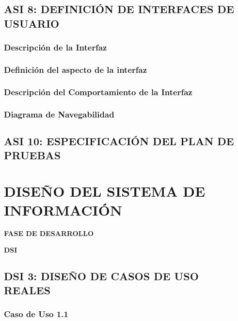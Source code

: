 \documentclass[11pt]{report}
\begin{document}
\newpage
\section{ASI 8: DEFINICIÓN DE INTERFACES DE USUARIO}

\subsection{Descripción de la Interfaz} 

\subsection{Definición del aspecto de la interfaz}

\subsection{Descripción del Comportamiento de la Interfaz} 

\subsection{Diagrama de Navegabilidad}


\newpage
\section{ASI 10: ESPECIFICACIÓN DEL PLAN DE PRUEBAS}


\newpage
\chapter{DISEÑO DEL SISTEMA DE INFORMACIÓN}
	\vspace{2cm}	
	\begin{center}
	{\Large \textbf{FASE DE DESARROLLO} \par}
	\end{center}
	\vspace{5cm}
	
	\begin{center}
	\Huge \textbf{DSI}\par
	\end{center}

\newpage


\section{DSI 3: DISEÑO DE CASOS DE USO REALES}

\subsection{Caso de Uso 1.1} 
\end{document}
